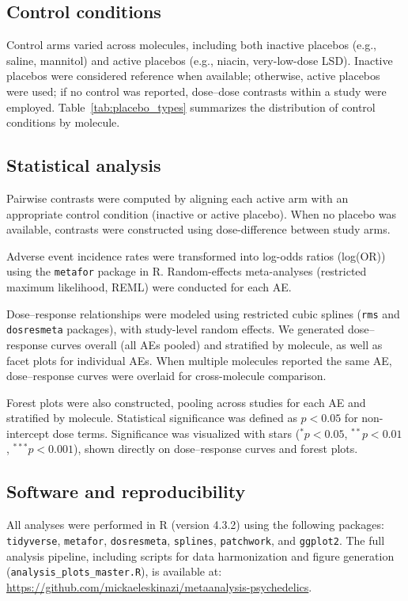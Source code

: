 \documentclass[12pt,a4paper]{article}
\begin{document}
\subsection{Control conditions}
Control arms varied across molecules, including both inactive placebos (e.g., saline, mannitol) and active placebos (e.g., niacin, very-low-dose LSD). Inactive placebos were considered reference when available; otherwise, active placebos were used; if no control was reported, dose–dose contrasts within a study were employed. Table~\ref{tab:placebo_types} summarizes the distribution of control conditions by molecule.  

\subsection{Statistical analysis}
Pairwise contrasts were computed by aligning each active arm with an appropriate control condition (inactive or active placebo). When no placebo was available, contrasts were constructed using dose-difference between study arms.  

Adverse event incidence rates were transformed into log-odds ratios (log(OR)) using the \texttt{metafor} package in R. Random-effects meta-analyses (restricted maximum likelihood, REML) were conducted for each AE.  

Dose–response relationships were modeled using restricted cubic splines (\texttt{rms} and \texttt{dosresmeta} packages), with study-level random effects. We generated dose–response curves overall (all AEs pooled) and stratified by molecule, as well as facet plots for individual AEs. When multiple molecules reported the same AE, dose–response curves were overlaid for cross-molecule comparison.  

Forest plots were also constructed, pooling across studies for each AE and stratified by molecule. Statistical significance was defined as $p<0.05$ for non-intercept dose terms. Significance was visualized with stars ($^{*}p<0.05$, $^{**}p<0.01$, $^{***}p<0.001$), shown directly on dose–response curves and forest plots.  

\subsection{Software and reproducibility}
All analyses were performed in R (version 4.3.2) using the following packages: \texttt{tidyverse}, \texttt{metafor}, \texttt{dosresmeta}, \texttt{splines}, \texttt{patchwork}, and \texttt{ggplot2}.  
The full analysis pipeline, including scripts for data harmonization and figure generation (\texttt{analysis\_plots\_master.R}), is available at:  
\url{https://github.com/mickaeleskinazi/metaanalysis-psychedelics}.  
\end{document}
